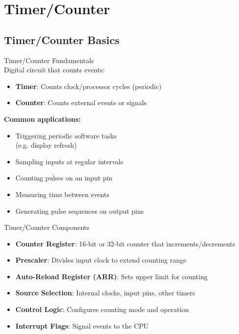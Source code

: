 \section{Timer/Counter}

\subsection{Timer/Counter Basics}



\begin{definition}{Timer/Counter Fundamentals}\\
Digital circuit that counts events:
\begin{itemize}
    \item \textbf{Timer}: Counts clock/processor cycles (periodic)
    \item \textbf{Counter}: Counts external events or signals
\end{itemize}
\vspace{2mm}
\textbf{Common applications:}
\begin{itemize}
    \item Triggering periodic software tasks \\ (e.g. display refresh)
    \item Sampling inputs at regular intervals
    \item Counting pulses on an input pin
    \item Measuring time between events
    \item Generating pulse sequences on output pins
\end{itemize}
\end{definition}

\begin{concept}{Timer/Counter Components}
\begin{itemize}
    \item \textbf{Counter Register}: 16-bit or 32-bit counter that increments/decrements
    \item \textbf{Prescaler}: Divides input clock to extend counting range
    \item \textbf{Auto-Reload Register (ARR)}: Sets upper limit for counting
    \item \textbf{Source Selection}: Internal clocks, input pins, other timers
    \item \textbf{Control Logic}: Configures counting mode and operation
    \item \textbf{Interrupt Flags}: Signal events to the CPU
\end{itemize}
\end{concept}

